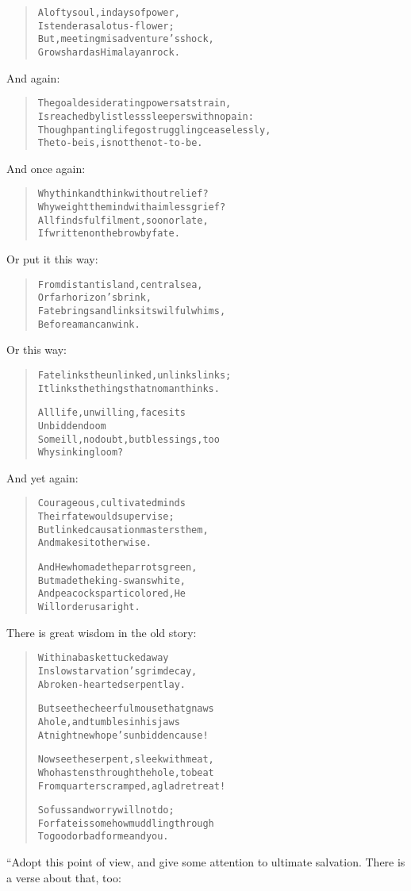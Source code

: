 \documentclass[article, twoside, 14pt]{memoir}
\renewenvironment{verbatim}{%
\begin{quote}%
\vskip -10pt%
\begin{alltt}\normalfont\large}{\end{alltt}%
\end{quote}%
\vskip -10pt
} %
\begin{document}
\begin{verbatim}
A lofty soul, in days of power,
Is tender as a lotus-flower;
But, meeting misadventure's shock,
Grows hard as Himalayan rock.
\end{verbatim}
And again:

\begin{verbatim}
The goal desiderating powers at strain,
Is reached by listless sleepers with no pain:
Though panting life go struggling ceaselessly,
The to-be is, is not the not-to-be.
\end{verbatim}
And once again:

\begin{verbatim}
Why think and think without relief?
Why weight the mind with aimless grief?
All finds fulfilment, soon or late,
If written on the brow by fate.
\end{verbatim}
Or put it this way:

\begin{verbatim}
From distant island, central sea,
Or far horizon's brink,
Fate brings and links its wilful whims,
Before a man can wink.
\end{verbatim}
Or this way:

\begin{verbatim}
Fate links the unlinked, unlinks links;
It links the things that no man thinks.

All life, unwilling, faces its
    Unbidden doom{\textemdash}
Some ill, no doubt, but blessings, too{\textemdash}
    Why sink in gloom?
\end{verbatim}
And yet again:

\begin{verbatim}
Courageous, cultivated minds
    Their fate would supervise;
But linked causation masters them,
    And makes it otherwise.

And He who made the parrots green,
    But made the king-swans white,
And peacocks particolored, He
    Will order us aright.
\end{verbatim}
There is great wisdom in the old story:

\begin{verbatim}
Within a basket tucked away
In slow starvation's grim decay,
A broken-hearted serpent lay.

But see the cheerful mouse that gnaws
A hole, and tumbles in his jaws
At night{\textemdash}new hope's unbidden cause!

Now see the serpent, sleek with meat,
Who hastens through the hole, to beat
From quarters cramped, a glad retreat!

So fuss and worry will not do;
For fate is somehow muddling through
To good or bad for me and you.
\end{verbatim}
“Adopt this point of view, and give some attention to ultimate
salvation. There is a verse about that, too:
\end{document}
